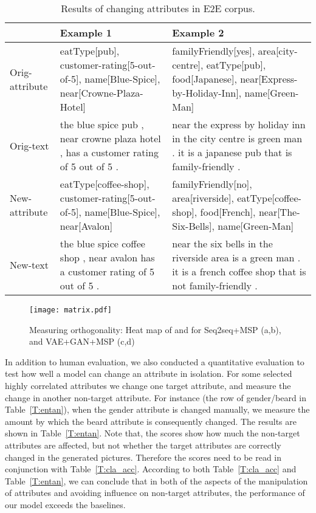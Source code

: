 \documentclass{article}
\begin{document}
\begin{table*}[tb]
\begin{center}
\begin{tabular}{|l|p{6.5cm}|>{\raggedright\arraybackslash}p{7.4cm}|}
\hline
& Example 1 & Example 2
\\ \hline
Orig-attribute 
& eatType[pub], customer-rating[5-out-of-5], name[Blue-Spice], near[Crowne-Plaza-Hotel]
& familyFriendly[yes], area[city-centre], eatType[pub], food[Japanese], near[Express-by-Holiday-Inn], name[Green-Man]
\\ \hline
Orig-text 
&  the blue spice pub , near crowne plaza hotel , has a customer rating of 5 out of 5 .
& near the express by holiday inn in the city centre is green man . it is a japanese pub that is family-friendly .
\\ \hline
New-attribute 
& eatType[coffee-shop], customer-rating[5-out-of-5], name[Blue-Spice], near[Avalon]
& familyFriendly[no], area[riverside], eatType[coffee-shop], food[French], near[The-Six-Bells], name[Green-Man]
\\ \hline
New-text
& the blue spice coffee shop , near avalon has a customer rating of 5 out of 5 .
& near the six bells in the riverside area is a green man . it is a french coffee shop that is not family-friendly .
\\ \hline
\end{tabular}
\end{center}
\caption{Results of changing attributes in E2E corpus.}
\small
\label{tab:exp-text}
\end{table*}

\begin{figure*}[tb]
\centering
    \texttt{[image: matrix.pdf]}
    \caption{Measuring orthogonality: Heat map of  and  for Seq2seq+MSP (a,b), and VAE+GAN+MSP (c,d)}
    \label{fig:orthog}
\end{figure*}

In addition to human evaluation, we also conducted a quantitative evaluation to test how well a model can change an attribute in isolation. For some selected  highly correlated attributes we change one target attribute, and measure the change in another non-target attribute. For instance (the row of gender/beard in Table~\ref{T:entan}), when the gender attribute is changed manually, we measure the amount by which the beard attribute is consequently changed. The results are shown in Table~\ref{T:entan}. 
Note that, the scores show how much the non-target attributes are affected, but not whether the target attributes are correctly changed in the generated pictures. Therefore the scores need to  be read in conjunction with Table~\ref{T:cla_acc}. According to both Table~\ref{T:cla_acc} and Table~\ref{T:entan}, we can conclude that in both of the aspects of the manipulation of attributes and avoiding influence on non-target attributes, the performance of our model exceeds the baselines.
\end{document}
